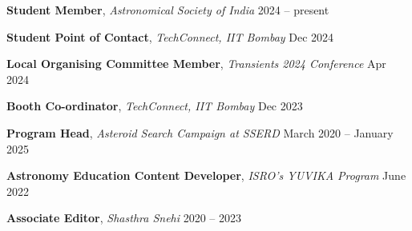 \textbf{Student Member}, \textit{Astronomical Society of India} \hfill 2024 -- present

\vspace{0.2em}

\textbf{Student Point of Contact}, \textit{TechConnect, IIT Bombay} \hfill Dec 2024 \\

\vspace{0.2em}

\textbf{Local Organising Committee Member}, \textit{Transients 2024 Conference} \hfill Apr 2024 \\

\vspace{0.2em}

\textbf{Booth Co-ordinator}, \textit{TechConnect, IIT Bombay }\hfill Dec 2023 \\

\vspace{0.2em}

\textbf{Program Head}, \textit{Asteroid Search Campaign at SSERD} \hfill March 2020 -- January 2025 \\

\vspace{0.2em}

\textbf{Astronomy Education Content Developer}, \textit{ISRO's YUVIKA Program} \hfill June 2022 \\

\vspace{0.2em}

\textbf{Associate Editor}, \textit{Shasthra Snehi} \hfill 2020 -- 2023